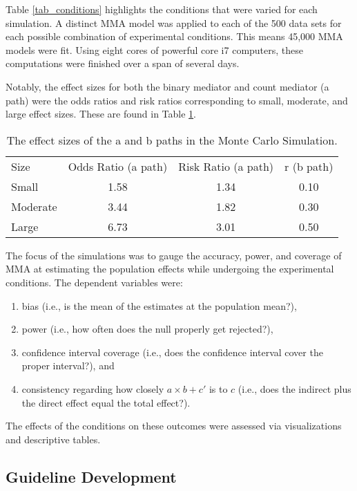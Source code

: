 \documentclass[]{DissertateUSU}
\providecommand{\tightlist}{%
  \setlength{\itemsep}{0pt}\setlength{\parskip}{0pt}}
\begin{document}
Table \ref{tab_conditions} highlights the conditions that were varied
for each simulation. A distinct MMA model was applied to each of the 500
data sets for each possible combination of experimental conditions. This
means 45,000 MMA models were fit. Using eight cores of powerful core i7
computers, these computations were finished over a span of several days.

Notably, the effect sizes for both the binary mediator and count
mediator (a path) were the odds ratios and risk ratios corresponding to
small, moderate, and large effect sizes. These are found in Table
\ref{effectsizes}.

\begin{table}[tb]
\centering
\caption{The effect sizes of the a and b paths in the Monte Carlo Simulation.} 
\label{effectsizes}
\begin{tabular}{lccc}
Size & Odds Ratio (a path) & Risk Ratio (a path) & r (b path) \\ 
Small    & 1.58 & 1.34 & 0.10 \\ 
Moderate & 3.44 & 1.82 & 0.30 \\
Large    & 6.73 & 3.01 & 0.50 \\ 
\end{tabular}
\end{table}

The focus of the simulations was to gauge the accuracy, power, and
coverage of MMA at estimating the population effects while undergoing
the experimental conditions. The dependent variables were:

\begin{enumerate}
\def\labelenumi{\arabic{enumi}.}
\tightlist
\item
  bias (i.e., is the mean of the estimates at the population mean?),
\item
  power (i.e., how often does the null properly get rejected?),
\item
  confidence interval coverage (i.e., does the confidence interval cover
  the proper interval?), and
\item
  consistency regarding how closely \(a \times b + c'\) is to \(c\)
  (i.e., does the indirect plus the direct effect equal the total
  effect?).
\end{enumerate}

\noindent The effects of the conditions on these outcomes were assessed
via visualizations and descriptive tables.

\subsection{Guideline Development}\label{guideline-development}
\end{document}
